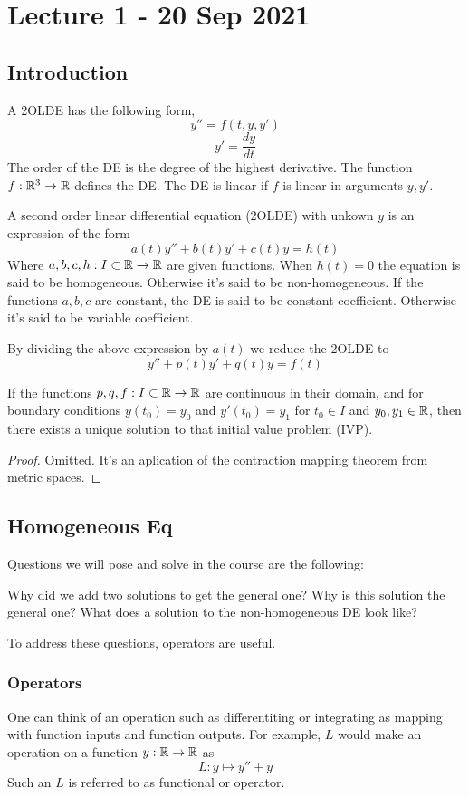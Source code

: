 \section{Lecture 1 - 20 Sep 2021}
\subsection{Introduction}
A 2OLDE has the following form,
\[ y'' = f(t,y,y')\]
\[ y' = \frac{dy}{dt}\]
The order of the DE is the degree of the highest derivative. The function $f:\mathbb R^3\to\mathbb R$
defines the DE. The DE is linear if $f$ is linear in arguments $y,y'$.
\begin{definition}
  A second order linear differential equation (2OLDE) with unkown $y$ is an expression of
  the form
  \[a(t)y'' + b(t)y' + c(t)y = h(t)\]
  Where $a,b,c,h:I\subset\mathbb R\to\mathbb R$ are given functions. When $h(t)=0$ the equation is
  said to be homogeneous. Otherwise it's said to be non-homogeneous. If the functions
  $a,b,c$ are constant, the DE is said to be constant coefficient. Otherwise it's said to
  be variable coefficient.

  By dividing the above expression by $a(t)$ we reduce the 2OLDE to
  \[y'' + p(t)y' + q(t)y = f(t)\]
  \label{2olde}
\end{definition}


\begin{theorem}
  If the functions $p,q,f:I\subset\mathbb R\to\mathbb R$ are continuous in their domain, and for
  boundary conditions $y(t_0)=y_0$ and $y'(t_0)=y_1$ for $t_0\in I$ and $y_0,y_1\in\mathbb R$,
  then there exists a unique solution to that initial value problem (IVP).
  
  \label{uniquenessSolutionIVP}
  \begin{proof}
    Omitted. It's an aplication of the contraction mapping theorem from metric spaces.
  \end{proof}
\end{theorem}


\subsection{Homogeneous Eq}
Questions we will pose and solve in the course are the following:
\begin{itemize}
  \ii Why did we add two solutions to get the general one? 
  \ii Why is this solution the general one?
  \ii What does a solution to the non-homogeneous DE look like?
\end{itemize}
To address these questions, operators are useful.

\subsubsection{Operators}
One can think of an operation such as differentiting or integrating as mapping with
function inputs and function outputs. For example, $L$ would make an operation on a
function $y:\mathbb R\to\mathbb R$ as 
\[ L: y\mapsto y''+y \]
Such an $L$ is referred to as functional or operator.

